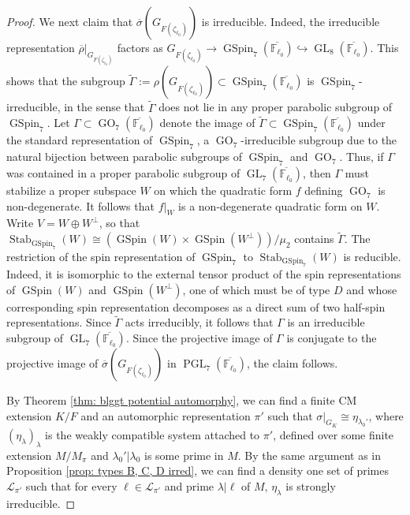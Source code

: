 \documentclass{amsart}
\theoremstyle{definition}
\numberwithin{equation}{section} %
\newcommand{\GL}{\operatorname{GL}}
\newcommand{\PGL}{\operatorname{PGL}}
\newcommand{\GSpin}{\operatorname{GSpin}}
\newcommand{\GO}{\operatorname{GO}}
\newcommand{\wt}[1]{\widetilde{#1}}
\begin{document}
\begin{proof}
We next claim that $\overline{\sigma}(G_{F(\zeta_{\ell_0})})$ is irreducible.
Indeed, the irreducible representation $\overline{\rho}|_{G_{F(\zeta_{\ell_0})}}$ factors as $G_{F(\zeta_{\ell_0})} \to \GSpin_7(\overline{\mathbb{F}_{\ell_0}}) \hookrightarrow \GL_8(\overline{\mathbb{F}_{\ell_0}})$.
This shows that the subgroup $\tilde{\Gamma} := \rho(G_{F(\zeta_{\ell_0})}) \subset \GSpin_7(\overline{\mathbb{F}_{\ell_0}})$ is $\GSpin_7$-irreducible, in the sense that $\tilde{\Gamma}$ does not lie in any proper parabolic subgroup of $\GSpin_7$.
Let $\Gamma \subset \GO_7(\overline{\mathbb{F}_{\ell_0}})$ denote the image of $\tilde{\Gamma} \subset \GSpin_7(\overline{\mathbb{F}_{\ell_0}})$ under the standard representation of $\GSpin_7$, a $\GO_7$-irreducible subgroup due to the natural bijection between parabolic subgroups of $\GSpin_7$ and $\GO_7$. 
Thus, if $\Gamma$ was contained in a proper parabolic subgroup of $\GL_7(\overline{\mathbb{F}_{\ell_0}})$, then $\Gamma$ must stabilize a proper subspace $W$ on which the quadratic form \( f \) defining $\GO_7$ is non-degenerate. It follows that \( f|_W \) is a non-degenerate quadratic form on \( W \). Write \( V=W\oplus W^\perp \), so that $\operatorname{Stab}_{\GSpin_7}(W) \cong (\GSpin(W) \times \GSpin(W^\perp))/\mu_2$ contains \( \wt{\Gamma} \).
The restriction of the spin representation of $\GSpin_7$ to $\operatorname{Stab}_{\GSpin_7}(W)$ is reducible.
Indeed, it is isomorphic to the external tensor product of the spin representations of $\GSpin(W)$ and $\GSpin(W^\perp)$, one of which must be of type $D$ and whose corresponding spin representation decomposes as a direct sum of two half-spin representations.
Since $\tilde{\Gamma}$ acts irreducibly, it follows that $\Gamma$ is an irreducible subgroup of $\GL_7(\overline{\mathbb{F}_{\ell_0}})$.
Since the projective image of $\Gamma$ is conjugate to the projective image of $\overline{\sigma}(G_{F(\zeta_{\ell_0})})$ in $\PGL_7(\overline{\mathbb{F}_{\ell_0}})$, the claim follows.

By Theorem \ref{thm: blggt potential automorphy}, we can find a finite CM extension $K/F$ and an automorphic representation $\pi'$ such that $\sigma|_{G_K} \cong \eta_{\lambda_0'}$, where $(\eta_\lambda)_\lambda$ is the weakly compatible system attached to $\pi'$, defined over some finite extension $M/M_\pi$ and $\lambda_0'|\lambda_0$ is some prime in $M$.
By the same argument as in Proposition \ref{prop: types B, C, D irred}, we can find a density one set of primes $\mathcal{L}_{\pi'}$ such that for every $\ell \in \mathcal{L}_{\pi'}$ and prime $\lambda|\ell$ of $M$, $\eta_\lambda$ is strongly irreducible.


\end{proof}
\end{document}
